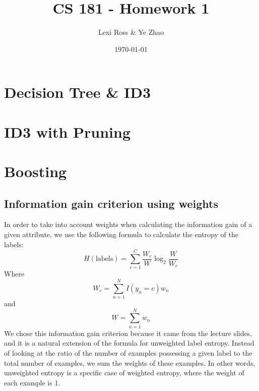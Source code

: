 \documentclass[11pt]{article}
\title{\bf CS 181 - Homework 1}
\date{\today}
\author{Lexi Ross \& Ye Zhao}
\begin{document}
\maketitle
\section{Decision Tree \& ID3}

\section{ID3 with Pruning}

\section{Boosting}

\subsection{Information gain criterion using weights}
In order to take into account weights when calculating the information gain of a given attribute, we use the following formula to calculate the entropy of the labels:
$$H(\text{labels})=\sum_{c=1}^{C}\frac{W_c}{W}\log_2\frac{W}{W_c}$$
Where $$W_c = \sum_{n=1}^{N}I(y_n=c)w_n$$ and $$W=\sum_{n=1}^{N}w_n$$
We chose this information gain criterion because it came from the lecture slides, and it is a natural extension of the formula for unweighted label entropy. Instead of looking at the ratio of the number of examples possessing a given label to the total number of examples, we sum the weights of these examples. In other words, unweighted entropy is a specific case of weighted entropy, where the weight of each example is 1.
\end{document}
